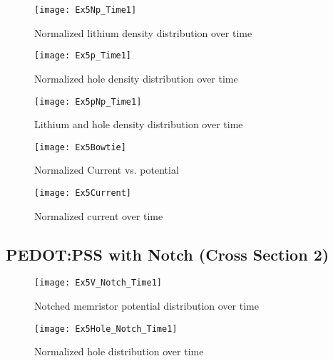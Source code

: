 \begin{landscape}
\begin{figure}[!htp]
\centering
\texttt{[image: Ex5Np\_Time1]}
\caption{Normalized lithium density distribution over time} 
\label{}
\end{figure}
\end{landscape}


\begin{landscape}
\begin{figure}[!htp]
\centering
\texttt{[image: Ex5p\_Time1]}
\caption{Normalized hole density distribution over time} 
\label{}
\end{figure}
\end{landscape}

\begin{landscape}
\begin{figure}[!htp]
\centering
\texttt{[image: Ex5pNp\_Time1]}
\caption{Lithium and hole density distribution over time} 
\label{}
\end{figure}
\end{landscape}



\begin{figure}[!htp]
\centering
\texttt{[image: Ex5Bowtie]}
\caption{Normalized Current vs. potential} 
\label{}
\end{figure}

\begin{figure}[!htp]
\centering
\texttt{[image: Ex5Current]}
\caption{Normalized current over time} 
\label{}
\end{figure}



\clearpage
\subsection{PEDOT:PSS with Notch (Cross Section 2)}


\begin{landscape}
\begin{figure}[!htp]
\centering
\texttt{[image: Ex5V\_Notch\_Time1]}
\caption{Notched memristor potential distribution over time} 
\label{}
\end{figure}
\end{landscape}



\begin{landscape}
\begin{figure}[!htp]
\centering
\texttt{[image: Ex5Hole\_Notch\_Time1]}
\caption{Normalized hole distribution over time} 
\label{}
\end{figure}
\end{landscape}


